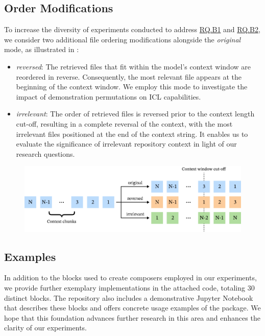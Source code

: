 \subsection{Order Modifications}

To increase the diversity of experiments conducted to address \hyperref[rq:rq-b1]{RQ.B1} and \hyperref[rq:rq-b2]{RQ.B2}, we consider two additional file ordering modifications alongside the \textit{original} mode, as illustrated in :

\begin{itemize}
    \item \textit{reversed}: The retrieved files that fit within the model's context window are reordered in reverse. Consequently, the most relevant file appears at the beginning of the context window. We employ this mode to investigate the impact of demonstration permutations on ICL capabilities.
    \item \textit{irrelevant}: The order of retrieved files is reversed prior to the context length cut-off, resulting in a complete reversal of the context, with the most irrelevant files positioned at the end of the context string. It enables us to evaluate the significance of irrelevant repository context in light of our research questions.
\end{itemize}

\begin{figure}[ht]
    \centering
    \includegraphics[width=\textwidth]{figures/order-modes.pdf}
    \label{fig:order-modes}
\end{figure}

\subsection{Examples}

In addition to the blocks used to create composers employed in our experiments, we provide further exemplary implementations in the attached code, totaling 30 distinct blocks. The repository also includes a demonstrative Jupyter Notebook that describes these blocks and offers concrete usage examples of the package. We hope that this foundation advances further research in this area and enhances the clarity of our experiments.

